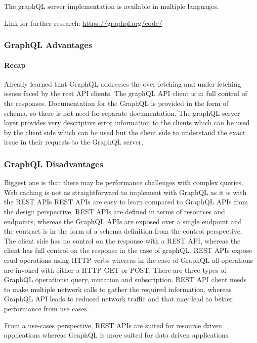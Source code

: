 The graphQL server implementation is available in multiple languages.
\begin{note}
    Link for further research: \href{https://graphql.org/code/}{https://graphql.org/code/}
\end{note}

\subsubsection{GraphQL Advantages}

\paragraph{Recap}
Already learned that GraphQL addresses the over fetching and under fetching issues faced by the rest API clients.
The graphQL API client is in full control of the responses.
Documentation for the GraphQL is provided in the form of schema, so there is not need for separate documentation.
The graphQL server layer provides very descriptive error information to the clients which can be used by the client side which can be used but the client side to understand the exact issue in their requests to the GraphQL server.

\subsubsection{GraphQL Disadvantages}
Biggest one is that there may be performance challenges with complex queries.
Web caching is not as straightforward to implement with GraphQL as it is with the REST APIs
REST APIs are easy to learn compared to GraphQL APIs from the design perspective.
REST APIs are defined in terms of resources and endpoints, whereas the GraphQL APIs are exposed over a single endpoint and the contract is in the form of a schema definition from the control perspective.
The client side has no control on the response with a REST API, whereas the client has full control on the response in the case of graphQL.
REST APIs expose crud operations using HTTP verbs whereas in the case of GraphQL all operations are invoked with either a HTTP GET or POST.
There are three types of GraphQL operations: query, mutation and subscription.
REST API client needs to make multiple network calls to gather the required information, whereas GraphQL API leads to reduced network traffic and that may lead to better performance from use cases.

\begin{note}
    From a use-cases perspective, REST APIs are suited for resource driven applications whereas GraphQL is more suited for data driven applications %
\end{note}

